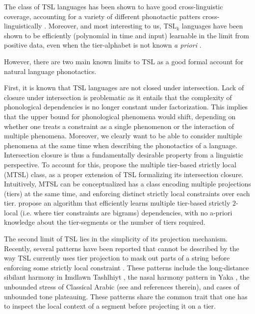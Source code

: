 \documentclass[11pt,a4paper]{article}
\begin{document}
The class of TSL languages has been shown to have good cross-linguistic coverage, accounting for a variety of different phonotactic patters cross-linguistically \citep{HeinzRawalTanner,McMullin16,Graf17Phonology}.
Moreover, and most interesting to us, TSL$_k$ languages have been shown to be efficiently (polynomial in time and input) learnable in the limit from positive data, even when the tier-alphabet is not known \emph{a priori}  \citep{JardineHeinz16,jardinemcmullin17}.

However, there are two main known limits to TSL as a good formal account for natural language phonotactics.

First, it is known that TSL languages are not closed under intersection.
Lack of closure under intersection is problematic as it entails that the complexity of phonological dependencies is no longer constant under factorization.
This implies that the upper bound for phonological phenomena would shift, depending on whether one treats a constraint as a single phenomenon or the interaction of multiple phenomena.
Moreover, we clearly want to be able to consider multiple phenomena at the same time when describing the phonotactics of a language.
Intersection closure is thus a fundamentally desirable property from a linguistic perspective.
To account for this, \citet{desanto2019structure} propose the multiple tier-based strictly local (MTSL) class, as a proper extension of TSL formalizing its intersection closure.
Intuitively, MTSL can be conceptualized has a class encoding multiple projections (tiers) at the same time, and enforcing distinct strictly local constraints over each tier.
\citet{McMullinSCIL2019} propose an algorithm that efficiently learns multiple tier-based strictly $2$-local  (i.e. where tier constraints are bigrams) dependencies, with no a-priori knowledge about the tier-segments or the number of tiers required.


The second limit of TSL lies in the simplicity of its projection mechanism.
Recently, several patterns have been reported that cannot be described by the way TSL currently uses tier projection to mask out parts of a string before enforcing some strictly local constraint \citep{McMullin16,MayerMajor18,Baek2017CLS,graf2018sanskrit,desanto2019structure}.
These patterns include the long-distance sibilant harmony in Imdlawn Tashlhiyt  \citep{McMullin16}, the nasal harmony pattern in Yaka \cite{WalkerYaka}, the unbounded stress of Classical Arabic (see \cite{Baek2017CLS} and references therein), and cases of unbounded tone plateauing.
These patterns share the common trait that one has to inspect the local context of a segment before projecting it on a tier. 
\end{document}
